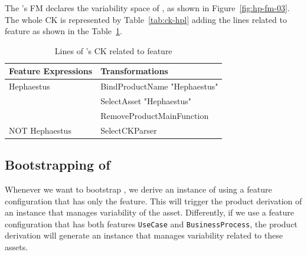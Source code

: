The \hpl{}'s FM declares the variability space of \hpl{}, as shown in Figure~\ref{fig:hp-fm-03}. The whole  CK is represented by Table~\ref{tab:ck-hpl} adding the lines related to \texttt{\hp{}} feature as shown in the Table~\ref{tab:ck-hpl-2}.


\begin{table}[h]
\begin{center}
\begin{tabular}{||l||l||}
  \hline
  \textbf{Feature Expressions} & \textbf{Transformations}   \\  \hline
  Hephaestus & BindProductName "Hephaestus" \\
             &  SelectAsset "Hephaestus"   \\
             &  RemoveProductMainFunction \\ \hline
  NOT Hephaestus & SelectCKParser \\ \hline
\end{tabular}
\caption{Lines of \hpl's CK related to \texttt{\hp{}} feature}
\label{tab:ck-hpl-2}
\end{center}
\end{table}


\subsection{Bootstrapping of \hpl} 
\label{sec:hpl-bootstrapping}

Whenever we want to bootstrap \hpl, we derive an instance of \hpl{} using a feature configuration that has only the \texttt{\hp{}} feature. This will trigger the product derivation of an instance that manages variability of the \hp{} asset. Differently, if we use a feature configuration that has both features \texttt{UseCase} and \texttt{BusinessProcess}, the product derivation will generate an \hpl{} instance that manages variability related to these assets.

